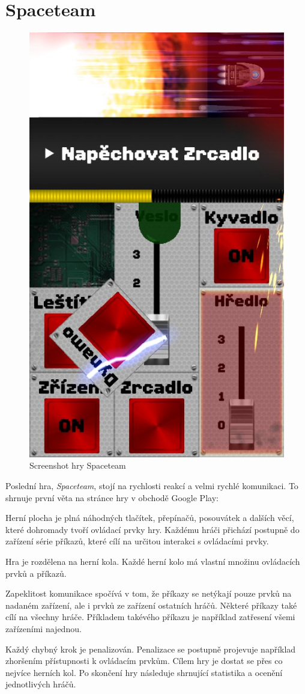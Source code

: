 \section{Spaceteam}

\begin{figure}[h!]
    \centering
    \includegraphics[width=0.5\linewidth]{assets/competitive-apps/spaceteam.jpg}
    \caption{Screenshot hry Spaceteam \cite{henrysmithinc_spaceteam}}
    \label{fig:spaceteam}
\end{figure}

Poslední hra, \emph{Spaceteam}, stojí na rychlosti reakcí a velmi rychlé
komunikaci.
To shrnuje první věta na stránce hry \cite{henrysmithinc_spaceteam}
v obchodě Google Play: 

Herní plocha je plná náhodných tlačítek, přepínačů, posouvátek a dalších věcí,
které dohromady tvoří ovládací prvky hry.
Každému hráči přichází postupně do zařízení série příkazů,
které cílí na určitou interakci s ovládacími prvky.

Hra je rozdělena na herní kola.
Každé herní kolo má vlastní množinu ovládacích prvků a příkazů.

Zapeklitost komunikace spočívá v tom,
že příkazy se netýkají pouze prvků na nadaném zařízení,
ale i prvků ze zařízení ostatních hráčů.
Některé příkazy také cílí na všechny hráče.
Příkladem takévého příkazu je například zatřesení všemi zařízeními najednou.

Každý chybný krok je penalizován.
Penalizace se postupně projevuje například zhoršením přístupnosti k ovládacím
prvkům.
Cílem hry je dostat se přes co nejvíce herních kol.
Po skončení hry následuje shrnující statistika a ocenění jednotlivých hráčů.

